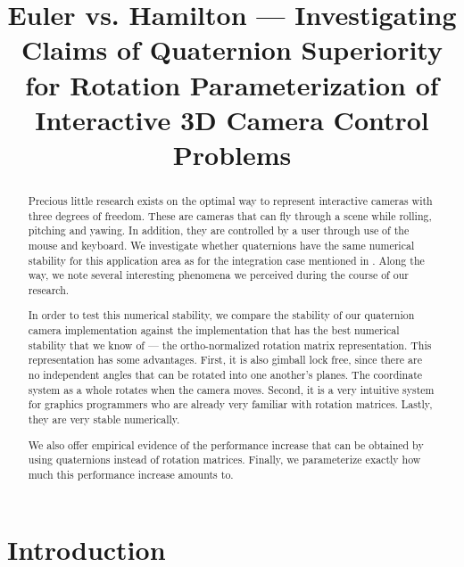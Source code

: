 \documentclass{acm_proc_article-sp}
\title{Euler vs. Hamilton --- Investigating Claims of Quaternion Superiority for Rotation Parameterization of Interactive 3D Camera Control Problems}
\author{}
\date{}
\begin{document}
\maketitle

\begin{abstract}
Precious little research exists on the optimal way to represent interactive cameras with three degrees of freedom.
These are cameras that can fly through a scene while rolling, pitching and yawing.
In addition, they are controlled by a user through use of the mouse and keyboard.
We investigate whether quaternions have the same numerical stability for this application area as for the integration case mentioned in \parencite{zupan11}.
Along the way, we note several interesting phenomena we perceived during the course of our research.

In order to test this numerical stability, we compare the stability of our quaternion camera implementation against the implementation that has the best numerical stability that we know of --- the ortho-normalized rotation matrix representation.
This representation has some advantages.
First, it is also gimball lock free, since there are no independent angles that can be rotated into one another's planes.
The coordinate system as a whole rotates when the camera moves.
Second, it is a very intuitive system for graphics programmers who are already very familiar with rotation matrices.
Lastly, they are very stable numerically.

We also offer empirical evidence of the performance increase that can be obtained by using quaternions instead of rotation matrices.
Finally, we parameterize exactly how much this performance increase amounts to.

\end{abstract}



\section{Introduction}
\end{document}
